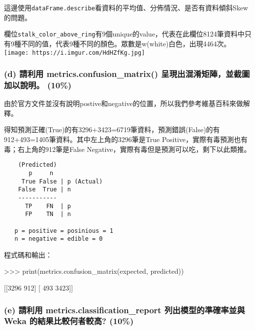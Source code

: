\documentclass[11pt]{article}
\makeatletter
\def\maxwidth{\ifdim\Gin@nat@width>\linewidth\linewidth
    \else\Gin@nat@width\fi}
\let\Oldincludegraphics\includegraphics
\renewcommand{\includegraphics}[1]{\Oldincludegraphics[width=.8\maxwidth]{#1}}
\newenvironment{Shaded}{}{}
\newcommand{\DecValTok}[1]{\textcolor[rgb]{0.25,0.63,0.44}{{#1}}}
\newcommand{\NormalTok}[1]{{#1}}
\newcommand{\OperatorTok}[1]{\textcolor[rgb]{0.40,0.40,0.40}{{#1}}}
\newcommand{\BuiltInTok}[1]{{#1}}
\makeatother
\begin{document}
這邊使用\texttt{dataFrame.describe}看資料的平均值、分佈情況、是否有資料傾斜Skew的問題。

欄位\texttt{stalk\_color\_above\_ring}有9個unique的value，代表在此欄位8124筆資料中只有9種不同的值，代表9種不同的顏色。眾數是w(white)白色，出現4464次。
\texttt{[image: https://i.imgur.com/HdHZfKg.jpg]}

    \subsubsection{(d) 請利用 metrics.confusion\_matrix()
呈現出混淆矩陣，並截圖加以說明。
(10\%)}\label{d-ux8acbux5229ux7528-metrics.confusion_matrix-ux5448ux73feux51faux6df7ux6dc6ux77e9ux9663ux4e26ux622aux5716ux52a0ux4ee5ux8aaaux660e-10}

由於官方文件並沒有說明postive和negative的位置，所以我們參考維基百科來做解釋。

得知預測正確(True)的有3296+3423=6719筆資料，預測錯誤(False)的有912+493=1405筆資料。其中左上角的3296筆是True
Positive，實際有毒預測也有毒；右上角的912筆是False
Negative，實際有毒但是預測可以吃，剩下以此類推。

\begin{verbatim}
    (Predicted)
       p     n
     True False | p (Actual) 
    False  True | n
    -----------
      TP    FN  | p
      FP    TN  | n
    
   p = positive = posinious = 1
   n = negative = edible = 0
\end{verbatim}

程式碼和輸出：

\begin{Shaded}
\begin{Highlighting}[]
\OperatorTok{>>>} \BuiltInTok{print}\NormalTok{(metrics.confusion_matrix(expected, predicted))}

\NormalTok{[[}\DecValTok{3296}  \DecValTok{912}\NormalTok{]}
\NormalTok{ [ }\DecValTok{493} \DecValTok{3423}\NormalTok{]]}
\end{Highlighting}
\end{Shaded}

    \subsubsection{(e) 請利用 metrics.classification\_report
列出模型的準確率並與 Weka 的結果比較何者較高?
(10\%)}\label{e-ux8acbux5229ux7528-metrics.classification_report-ux5217ux51faux6a21ux578bux7684ux6e96ux78baux7387ux4e26ux8207-weka-ux7684ux7d50ux679cux6bd4ux8f03ux4f55ux8005ux8f03ux9ad8-10}
\end{document}
